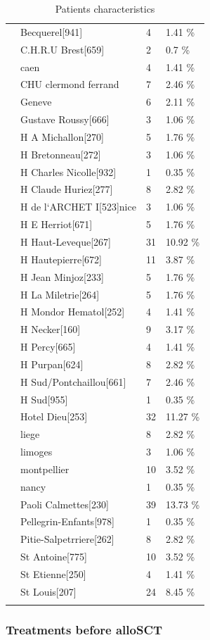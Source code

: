 \documentclass[a4paper,11pt] {article}
\begin{document}
\begin{longtable}{llll}
   & Becquerel[941] & 4 & 1.41 \% \\ 
   & C.H.R.U Brest[659] & 2 & 0.7 \% \\ 
   & caen & 4 & 1.41 \% \\ 
   & CHU clermond ferrand & 7 & 2.46 \% \\ 
   & Geneve & 6 & 2.11 \% \\ 
   & Gustave Roussy[666] & 3 & 1.06 \% \\ 
   & H A Michallon[270] & 5 & 1.76 \% \\ 
   & H Bretonneau[272] & 3 & 1.06 \% \\ 
   & H Charles Nicolle[932] & 1 & 0.35 \% \\ 
   & H Claude Huriez[277] & 8 & 2.82 \% \\ 
   & H de l`ARCHET I[523]nice & 3 & 1.06 \% \\ 
   & H E Herriot[671] & 5 & 1.76 \% \\ 
   & H Haut-Leveque[267] & 31 & 10.92 \% \\ 
   & H Hautepierre[672] & 11 & 3.87 \% \\ 
   & H Jean Minjoz[233] & 5 & 1.76 \% \\ 
   & H La Miletrie[264] & 5 & 1.76 \% \\ 
   & H Mondor Hematol[252] & 4 & 1.41 \% \\ 
   & H Necker[160] & 9 & 3.17 \% \\ 
   & H Percy[665] & 4 & 1.41 \% \\ 
   & H Purpan[624] & 8 & 2.82 \% \\ 
   & H Sud/Pontchaillou[661] & 7 & 2.46 \% \\ 
   & H Sud[955] & 1 & 0.35 \% \\ 
   & Hotel Dieu[253] & 32 & 11.27 \% \\ 
   & liege & 8 & 2.82 \% \\ 
   & limoges & 3 & 1.06 \% \\ 
   & montpellier & 10 & 3.52 \% \\ 
   & nancy & 1 & 0.35 \% \\ 
   & Paoli Calmettes[230] & 39 & 13.73 \% \\ 
   & Pellegrin-Enfants[978] & 1 & 0.35 \% \\ 
   & Pitie-Salpetrriere[262] & 8 & 2.82 \% \\ 
   & St Antoine[775] & 10 & 3.52 \% \\ 
   & St Etienne[250] & 4 & 1.41 \% \\ 
   & St Louis[207] & 24 & 8.45 \% \\ 
   \hline
\hline
\caption{Patients characteristics} 
\label{tab:condi}
\end{longtable} \subsubsection{Treatments before alloSCT}
\end{document}
